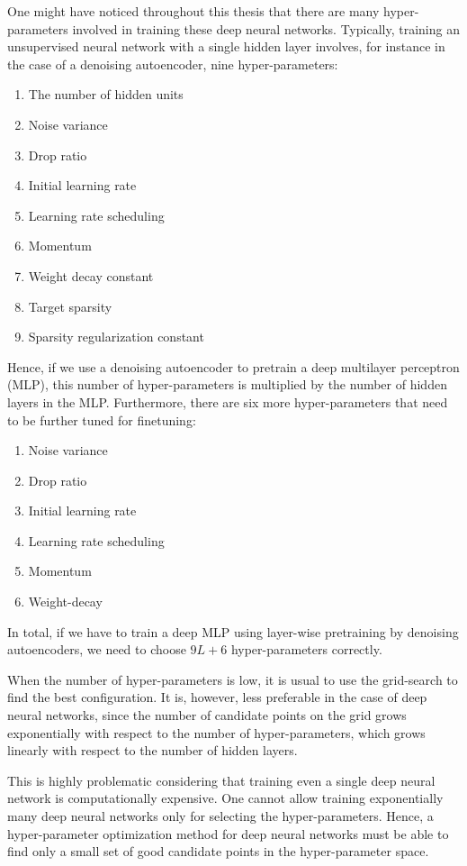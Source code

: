 \documentclass{now}
\begin{document}
One might have noticed throughout this thesis that there are many
hyper-parameters involved in training these deep neural networks. Typically,
training an unsupervised neural network with a single hidden layer involves, for
instance in the case of a denoising autoencoder, nine hyper-parameters:
\begin{enumerate}
    \itemsep 0em
    \item The number of hidden units
    \item Noise variance
    \item Drop ratio
    \item Initial learning rate
    \item Learning rate scheduling
    \item Momentum
    \item Weight decay constant
    \item Target sparsity
    \item Sparsity regularization constant
\end{enumerate}
Hence, if we use a denoising autoencoder to pretrain a deep multilayer
perceptron (MLP), this number of hyper-parameters is multiplied by the number of
hidden layers in the MLP. Furthermore, there are six more hyper-parameters that
need to be further tuned for finetuning: 
\begin{enumerate}
    \itemsep 0em
    \item Noise variance
    \item Drop ratio
    \item Initial learning rate
    \item Learning rate scheduling
    \item Momentum
    \item Weight-decay
\end{enumerate}
In total, if we have to train a deep MLP using layer-wise pretraining by
denoising autoencoders, we need to choose $9L + 6$ hyper-parameters correctly. 

When the number of hyper-parameters is low, it is usual to use the grid-search
to find the best configuration. It is, however, less preferable in the case of
deep neural networks, since the number of candidate points on the grid grows
exponentially with respect to the number of hyper-parameters, which grows
linearly with respect to the number of hidden layers. 

This is highly problematic considering that training even a single deep neural
network is computationally expensive. One cannot allow training exponentially
many deep neural networks only for selecting the hyper-parameters.  Hence, a
hyper-parameter optimization method for deep neural networks must be able to
find only a small set of good candidate points in the hyper-parameter space.
\end{document}
